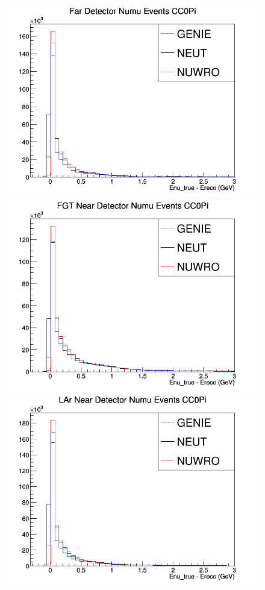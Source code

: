 \begin{figure}[h]
\endminipage
\newline
{}
\includegraphics[width=\linewidth]{Ereco_Etrue/numu_FD_CC0Pi.png}
\endminipage
{}
\includegraphics[width=\linewidth]{Ereco_Etrue/numu_FGT_CC0Pi.png}
\endminipage
{}
\includegraphics[width=\linewidth]{Ereco_Etrue/numu_LAr_CC0Pi.png}

\end{figure}

